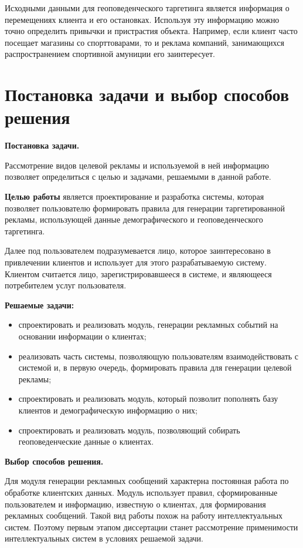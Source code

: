 Исходными данными для геоповеденческого таргетинга является информация о перемещениях клиента и его остановках. Используя эту информацию можно точно определить привычки и пристрастия объекта. Например, если клиент часто посещает магазины со спорттоварами, то и реклама компаний, занимающихся распространением спортивной амуниции его заинтересует.

\section{Постановка задачи и выбор способов решения}

\textbf{Постановка задачи.}

Рассмотрение видов целевой рекламы и используемой в ней информацию позволяет определиться с целью и задачами, решаемыми в данной работе.

\textbf{Целью работы} является проектирование и разработка системы, которая позволяет пользователю формировать правила для генерации таргетированной рекламы,  использующей данные демографического и геоповеденческого таргетинга. 

Далее под пользователем подразумевается лицо, которое заинтересовано в привлечении клиентов и использует для этого разрабатываемую систему. Клиентом считается лицо, зарегистрировавшееся в системе, и являющееся потребителем услуг пользователя. 

\textbf{Решаемые задачи:}

\begin{itemize}
	\item спроектировать и реализовать модуль, генерации рекламных событий на основании информации о клиентах;
	\item реализовать часть системы, позволяющую пользователям взаимодействовать с системой и, в первую очередь, формировать правила для генерации целевой рекламы;
	\item спроектировать и реализовать модуль, который позволит пополнять базу клиентов и демографическую информацию о них;
	\item спроектировать и реализовать модуль, позволяющий собирать геоповеденческие данные о клиентах.
\end{itemize}

\textbf{Выбор способов решения.}

Для модуля генерации рекламных сообщений характерна постоянная работа по обработке клиентских данных. Модуль использует правил, сформированные пользователем и информацию, известную о клиентах, для формирования рекламных сообщений. Такой вид работы похож на работу интеллектуальных систем. Поэтому первым этапом диссертации станет рассмотрение применимости интеллектуальных систем в условиях решаемой задачи.

